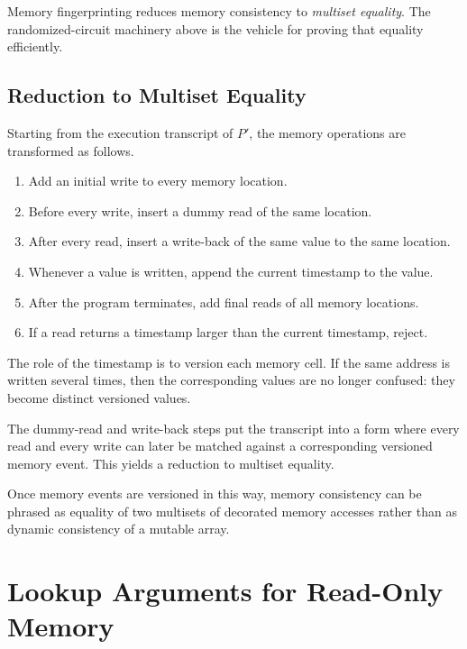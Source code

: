 \documentclass[11pt]{article}
\begin{document}
Memory fingerprinting reduces memory consistency to \emph{multiset equality}.
The randomized-circuit machinery above is the vehicle for proving that equality
efficiently.

\subsection{Reduction to Multiset Equality}

Starting from the execution transcript of $P'$, the memory operations are
transformed as follows.

\begin{enumerate}
  \item Add an initial write to every memory location.
  \item Before every write, insert a dummy read of the same location.
  \item After every read, insert a write-back of the same value to the same
        location.
  \item Whenever a value is written, append the current timestamp to the value.
  \item After the program terminates, add final reads of all memory locations.
  \item If a read returns a timestamp larger than the current timestamp, reject.
\end{enumerate}

The role of the timestamp is to version each memory cell.  If the same address
is written several times, then the corresponding values are no longer confused:
they become distinct versioned values.

The dummy-read and write-back steps put the transcript into a form where
every read and every write can later be matched against a corresponding
versioned memory event.  This yields a reduction to multiset equality.

\begin{remark}
Once memory events are versioned in this way, memory consistency can be
phrased as equality of two multisets of decorated memory accesses rather than
as dynamic consistency of a mutable array.
\end{remark}

\section{Lookup Arguments for Read-Only Memory}
\end{document}
